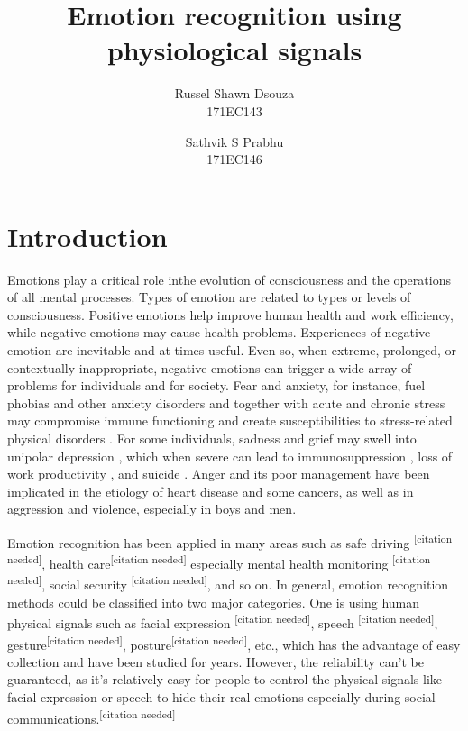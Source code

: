 \documentclass[11pt]{article}
\title{\textbf{Emotion recognition using physiological signals}}
\author{
  Russel Shawn Dsouza\\
  171EC143
  \and
  Sathvik S Prabhu\\
  171EC146
}
\date{}
\theoremstyle{definition}
\begin{document}
  \maketitle

  \section{Introduction}
    Emotions play a critical role inthe evolution of consciousness and the operations of all mental processes. Types of emotion are related to types or levels of consciousness.\cite{izard_emotion_2009}
    Positive emotions help improve human health and work efficiency, while negative emotions may cause health problems.
    Experiences of negative emotion are inevitable and at times useful. Even so, when extreme, prolonged, or contextually inappropriate, negative emotions can trigger a wide array of problems for individuals and for society. 
    Fear and anxiety, for instance, fuel phobias and other anxiety disorders \cite{ohman_automatic_1993} and together with acute and chronic stress may compromise immune functioning and create susceptibilities to stress-related physical disorders \cite{oleary_stress_1990}. 
    For some individuals, sadness and grief may swell into unipolar depression \cite{nolen-hoeksema_response_1993}, which when severe can lead to immunosuppression \cite{oleary_stress_1990}, loss of work productivity \cite{coryell_enduring_1993}, and suicide \cite{chen_lifetime_1996}. 
    Anger and its poor management have been implicated in the etiology of heart disease\cite{barefoot_hostility_1983, fredrickson2000hostility, scheier_person_1995} and some cancers\cite{eysenck_cancer_1994, greer_psychological_1975}, as well as in aggression and violence, especially in boys and men\cite{buss_evolution_2016, lemerise_development_2008}.

    Emotion recognition has been applied in many areas such as safe driving \textsuperscript{[citation needed]}, health care\textsuperscript{[citation needed]} especially mental health monitoring \textsuperscript{[citation needed]}, social security \textsuperscript{[citation needed]}, and so on. 
    In general, emotion recognition methods could be classified into two major categories. 
    One is using human physical signals such as facial expression \textsuperscript{[citation needed]}, speech \textsuperscript{[citation needed]}, gesture\textsuperscript{[citation needed]}, posture\textsuperscript{[citation needed]}, etc., which has the advantage of easy collection and have been studied for years. 
    However, the reliability can’t be guaranteed, as it’s relatively easy for people to control the physical signals like facial expression or speech to hide their real emotions especially during social communications.\textsuperscript{[citation needed]}
\end{document}
